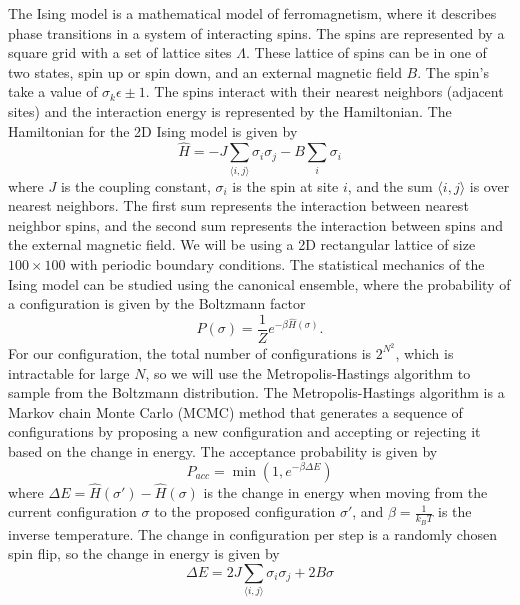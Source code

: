 \documentclass[
 reprint,
 amsmath,
 amssymb,
 aps,
]{revtex4-2}
\begin{document}
The Ising model is a mathematical model of ferromagnetism, where it describes phase transitions in a system of interacting spins. The spins are represented by a square grid with a set of lattice sites $\Lambda$.
These lattice of spins can be in one of two states, 
spin up or spin down, and an external magnetic field $ B $. The spin's take a value of $\sigma_k \epsilon \pm 1$. The spins interact with their nearest neighbors (adjacent sites) and the interaction energy is represented by the Hamiltonian. The Hamiltonian for the 2D Ising model is given by 
\begin{equation}
\hat{H} = -J \sum_{\langle i,j \rangle} \sigma_{i} \sigma_{j}
- B \sum_i \sigma_{i}
\end{equation}
where $ J $ is the coupling constant, 
$ \sigma_i $ is the spin at site $ i $,
and the sum $ \langle i,j \rangle $ is over nearest neighbors.
The first sum represents the interaction between nearest neighbor spins,
and the second sum represents the interaction between spins and the external
magnetic field.
We will be using a 2D rectangular lattice of size $ 100\times 100 $ with 
periodic boundary conditions.
The statistical mechanics of the Ising model can be studied using the
canonical ensemble, where the probability of a configuration is given by the
Boltzmann factor
\begin{equation}
P(\sigma) = \frac{1}{Z} e^{-\beta \hat{H}(\sigma)}.
\end{equation}
For our configuration,
the total number of configurations is $ 2^{N^{2}} $,
which is intractable for large $ N $,
so we will use the Metropolis-Hastings algorithm to sample from the
Boltzmann distribution.
The Metropolis-Hastings algorithm is a Markov chain Monte Carlo (MCMC)
method that generates a sequence of configurations by proposing a new
configuration and accepting or rejecting it based on the change in energy.
The acceptance probability is given by
\begin{equation}
P_{acc} = \min\left(1, e^{-\beta \Delta E}\right) 
\end{equation}
where $ \Delta E = \hat{H}(\sigma') - \hat{H}(\sigma) $ 
is the change in energy
when moving from the current configuration $ \sigma $ to the proposed
configuration $ \sigma' $,
and $ \beta = \frac{1}{k_{B}T}$ is the inverse temperature.
The change in configuration per step is a randomly chosen spin flip,
so the change in energy is given by 
\begin{equation}
\Delta E = 2J \sum_{\langle i,j \rangle} \sigma_{i} \sigma_{j} + 2B \sigma 
\end{equation}
\end{document}
